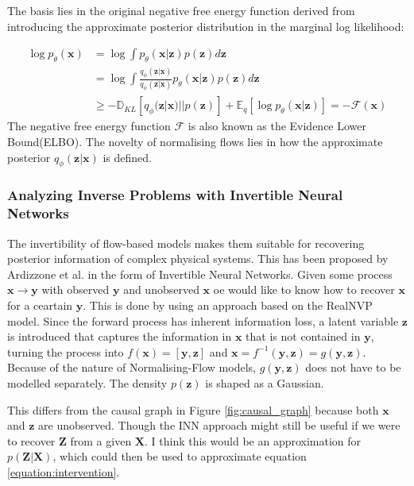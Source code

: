 \documentclass{article}
\newcommand{\bX}{\mathbf{X}}
\newcommand{\bx}{\mathbf{x}}
\newcommand{\by}{\mathbf{y}}
\newcommand{\bZ}{\mathbf{Z}}
\newcommand{\bz}{\mathbf{z}}
\begin{document}
The basis lies in the original negative free energy function derived from introducing the approximate posterior distribution in the marginal log likelihood:

\begin{equation}\label{equation:neg_free_energy}
    \begin{split}
    \log p_\theta(\bx) &= \log \int p_\theta(\bx | \bz) p(\bz) d\bz\\
    &= \log \int \frac{q_\phi(\bz|\bx)}{q_\phi(\bz|\bx)} p_\theta(\bx | \bz) p(\bz) d\bz\\
    &\geq -\mathbb{D}_{KL}[q_\phi(\bz|\bx) || p(\bz)] + \mathbb{E}_q[\log p_\theta(\bx|\bz)] = -\mathcal{F}(\bx)
    \end{split}    
\end{equation}
The negative free energy function $\mathcal{F}$ is also known as the Evidence Lower Bound(ELBO). The novelty of normalising flows lies in how the approximate posterior $q_\phi(\bz|\bx)$ is defined.  


\subsubsection*{Analyzing Inverse Problems with Invertible Neural Networks}
The invertibility of flow-based models makes them suitable for recovering posterior information of complex physical systems. This has been proposed by Ardizzone et al. \cite{ardizzone2018analyzing} in the form of Invertible Neural Networks. Given some process $\bx \rightarrow \by$ with observed $\by$ and unobserved $\bx$ oe would like to know how to recover $\bx$ for a ceartain $\by$. This is done by using an approach based on the RealNVP\cite{dinh2016density} model. Since the forward process has inherent information loss, a latent variable $\bz$ is introduced that captures the information in $\bx$ that is not contained in $\by$, turning the process into $f(\bx) = [\by, \bz]$  and $\bx = f^{-1}(\by, \bz) = g(\by, \bz)$. Because of the nature of Normalising-Flow models, $g(\by, \bz)$ does not have to be modelled separately. The density $p(\bz)$ is shaped as a Gaussian. 

This differs from the causal graph in Figure \ref{fig:causal_graph} because both $\bx$ and $\bz$ are unobserved. Though the INN approach might still be useful if we were to recover $\bZ$ from a given $\bX$. I think this would be an approximation for $p(\bZ | \bX)$, which could then be used to approximate equation \ref{equation:intervention}. 
\end{document}
